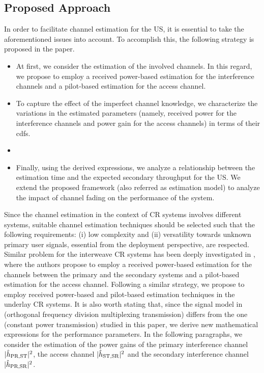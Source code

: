 \subsection{Proposed Approach} 
In order to facilitate channel estimation for the US, it is essential to take the aforementioned issues into account. To accomplish this, the following strategy is proposed in the paper.
\begin{itemize}
\item At first, we consider the estimation of the involved channels. In this regard, we propose to employ a received power-based estimation for the interference channels and a pilot-based estimation for the access channel. 
\item To capture the effect of the imperfect channel knowledge, we characterize the variations in the estimated parameters (namely, received power for the interference channels and power gain for the access channels) in terms of their cdfs.
\item {} 
\item Finally, using the derived expressions, we analyze a relationship between the estimation time and the expected secondary throughput for the US. We extend the proposed framework (also referred as estimation model) to analyze the impact of channel fading on the performance of the system. 
\end{itemize}
Since the channel estimation in the context of CR systems involves different systems, suitable channel estimation techniques should be selected such that the following requirements: (i) low complexity and (ii) versatility towards unknown primary user signals, essential from the deployment perspective, are respected. Similar problem for the interweave CR systems has been deeply investigated in \cite{Kaushik16}, where the authors propose to employ a received power-based estimation for the channels between the primary and the secondary systems and a pilot-based estimation for the access channel. Following a similar strategy, we propose to employ received power-based and pilot-based estimation techniques in the underlay CR systems. It is also worth stating that, since the signal model in \cite{Kaushik16} (orthogonal frequency division multiplexing transmission) differs from the one (constant power transmission) studied in this paper, we derive new mathematical expressions for the performance parameters. 
In the following paragraphs, we consider the estimation of the power gains of the primary interference channel $|\hat{h}_{\text{PR,ST}}|^2$, the access channel $|\hat{h}_{\text{ST,SR}}|^2$ and the secondary interference channel $|\hat{h}_{\text{PR,SR}}|^2$. 
